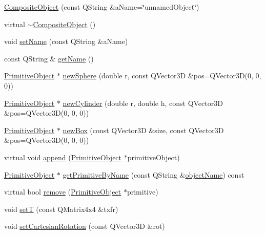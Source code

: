 \begin{DoxyCompactItemize}
\hyperlink{class_robot_model_1_1_composite_object_a54944e07b3c0b31d2b7a40e6d1e6e3c2}{CompositeObject} (const QString \&aName=\char`\"{}unnamedObject\char`\"{})
\item 
virtual \hyperlink{class_robot_model_1_1_composite_object_ad92ee593ee6e4e417ac3869d4ceec1da}{$\sim$CompositeObject} ()
\item 
void \hyperlink{class_robot_model_1_1_composite_object_a02a2c1ee58297a6ea0131fa808498a49}{setName} (const QString \&aName)
\item 
const QString \& \hyperlink{class_robot_model_1_1_composite_object_a893e71523b76afc186796fc95ead70d7}{getName} ()
\item 
\hyperlink{class_robot_model_1_1_primitive_object}{PrimitiveObject} $\ast$ \hyperlink{class_robot_model_1_1_composite_object_a6e54f38a81dcd568e8e6fc0373e94586}{newSphere} (double r, const QVector3D \&pos=QVector3D(0, 0, 0))
\item 
\hyperlink{class_robot_model_1_1_primitive_object}{PrimitiveObject} $\ast$ \hyperlink{class_robot_model_1_1_composite_object_a6140b34248d84bf28886ef206588126b}{newCylinder} (double r, double h, const QVector3D \&pos=QVector3D(0, 0, 0))
\item 
\hyperlink{class_robot_model_1_1_primitive_object}{PrimitiveObject} $\ast$ \hyperlink{class_robot_model_1_1_composite_object_a1085d65dd82c9c7033d52ac64b1fcd78}{newBox} (const QVector3D \&size, const QVector3D \&pos=QVector3D(0, 0, 0))
\item 
virtual void \hyperlink{class_robot_model_1_1_composite_object_a8a54a80ac04249fdcc18f28aae52683c}{append} (\hyperlink{class_robot_model_1_1_primitive_object}{PrimitiveObject} $\ast$primitiveObject)
\item 
\hyperlink{class_robot_model_1_1_primitive_object}{PrimitiveObject} $\ast$ \hyperlink{class_robot_model_1_1_composite_object_a2fb3a8d1fbe97bb575b2bde646162bd1}{getPrimitiveByName} (const QString \&\hyperlink{class_robot_model_1_1_composite_object_a4e833bb302d4a1a791211261251eff68}{objectName}) const 
\item 
virtual bool \hyperlink{class_robot_model_1_1_composite_object_a2bb6c23e4835fd85391f667b993f7477}{remove} (\hyperlink{class_robot_model_1_1_primitive_object}{PrimitiveObject} $\ast$primitive)
\item 
void \hyperlink{class_robot_model_1_1_composite_object_a9637a9594fc63f51e24bd620ec4b3792}{setT} (const QMatrix4x4 \&txfr)
\item 
void \hyperlink{class_robot_model_1_1_composite_object_a2e4886f283bbf8741c41a066241a1e55}{setCartesianRotation} (const QVector3D \&rot)

\end{DoxyCompactItemize}
